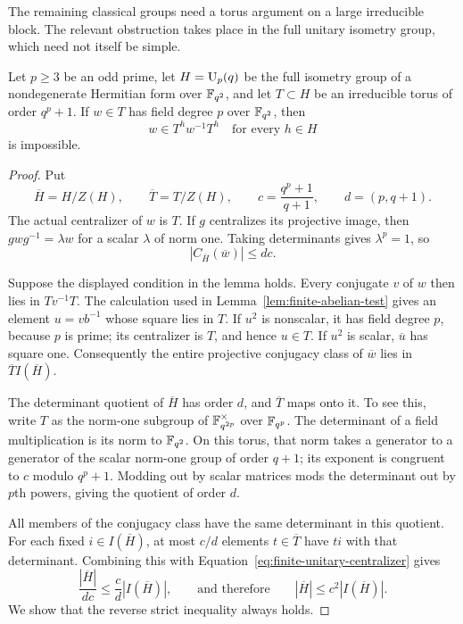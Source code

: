 The remaining classical groups need a torus argument on a large
irreducible block. The relevant obstruction takes place in the full
unitary isometry group, which need not itself be simple.

\begin{lemma}\label{lem:finite-unitary-count}
Let $p\ge3$ be an odd prime, let $H=\operatorname{U}_p(q)$ be the full isometry
group of a nondegenerate Hermitian form over $\mathbb F_{q^2}$, and let
$T\subset H$ be an irreducible torus of order $q^p+1$. If $w\in T$
has field degree $p$ over $\mathbb F_{q^2}$, then
\[
 w\in T^h w^{-1}T^h\quad\text{for every }h\in H
\]
is impossible.
\end{lemma}
\begin{proof}
Put
\[
 \overline H=H/Z(H),\qquad \overline T=T/Z(H),\qquad
 c=\frac{q^p+1}{q+1},\qquad d=(p,q+1).
\]
The actual centralizer of $w$ is $T$. If $g$ centralizes its projective
image, then $gwg^{-1}=\lambda w$ for a scalar $\lambda$ of norm one.
Taking determinants gives $\lambda^p=1$, so
\begin{equation}\label{eq:finite-unitary-centralizer}
 |C_{\overline H}(\overline w)|\le dc.
\end{equation}

Suppose the displayed condition in the lemma holds. Every conjugate
$v$ of $w$ then lies in $Tv^{-1}T$. The calculation used in
Lemma~\ref{lem:finite-abelian-test} gives an element $u=v b^{-1}$ whose
square lies in $T$. If $u^2$ is nonscalar, it has field degree $p$,
because $p$ is prime; its centralizer is $T$, and hence $u\in T$.
If $u^2$ is scalar, $\overline u$ has square one. Consequently the
entire projective conjugacy class of $\overline w$ lies in
$\overline T I(\overline H)$.

The determinant quotient of $\overline H$ has order $d$, and
$\overline T$ maps onto it. To see this, write $T$ as the norm-one
subgroup of $\mathbb F_{q^{2p}}^\times$ over $\mathbb F_{q^p}$. The determinant
of a field multiplication is its norm to $\mathbb F_{q^2}$. On this torus,
that norm takes a generator to a generator of the scalar norm-one
group of order $q+1$; its exponent is congruent to $c$ modulo
$q^p+1$. Modding out by scalar matrices mods the determinant out by
$p$th powers, giving the quotient of order $d$.

All members of the conjugacy class have the same determinant in this
quotient. For each fixed $i\in I(\overline H)$, at most $c/d$ elements
$t\in\overline T$ have $ti$ with that determinant. Combining this
with Equation~\eqref{eq:finite-unitary-centralizer} gives
\[
 \frac{|\overline H|}{dc}
 \le \frac c d |I(\overline H)|,
 \qquad\text{and therefore}\qquad
 |\overline H|\le c^2|I(\overline H)|.
\]
We show that the reverse strict inequality always holds.


\end{proof}

